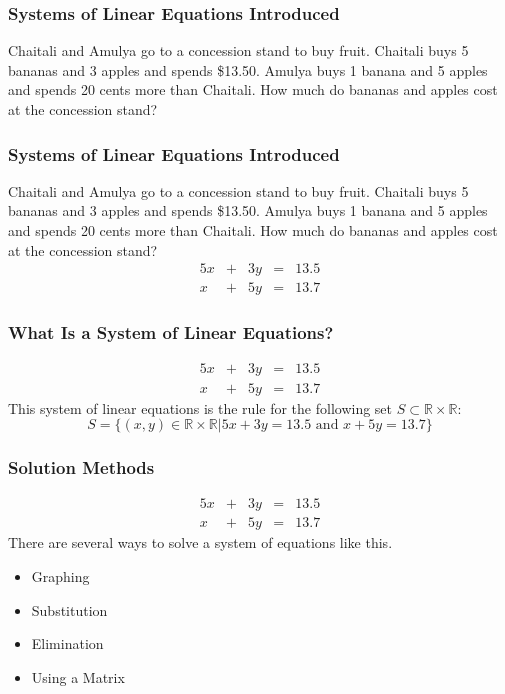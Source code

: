 \documentclass[xcolor=dvipsnames]{beamer}
\begin{document}
\begin{frame}
  \frametitle{Systems of Linear Equations Introduced}
  Chaitali and Amulya go to a concession stand to buy fruit. Chaitali
  buys 5 bananas and 3 apples and spends \$13.50. Amulya buys 1 banana
  and 5 apples and spends 20 cents more than Chaitali. How much do
  bananas and apples cost at the concession stand?
\end{frame}

\begin{frame}
  \frametitle{Systems of Linear Equations Introduced}
  Chaitali and Amulya go to a concession stand to buy fruit. Chaitali
  buys 5 bananas and 3 apples and spends \$13.50. Amulya buys 1 banana
  and 5 apples and spends 20 cents more than Chaitali. How much do
  bananas and apples cost at the concession stand?
  \begin{equation}
    \label{eq:mohloogh}
    \begin{array}{rcrcl}
      5x&+&3y&=&13.5 \\
      x&+&5y&=&13.7
    \end{array}
  \end{equation}
\end{frame}

\begin{frame}
  \frametitle{What Is a System of Linear Equations?}
  \begin{equation}
    \label{eq:xaigeeke}
    \begin{array}{rcrcl}
      5x&+&3y&=&13.5 \\
      x&+&5y&=&13.7
    \end{array}
  \end{equation}
  This system of linear equations is the rule for the following set $S\subset\mathbb{R}\times\mathbb{R}$:
  \begin{equation}
    \label{eq:ahshohwa}
S=\{(x,y)\in\mathbb{R}\times\mathbb{R}|5x+3y=13.5\mbox{ and }x+5y=13.7\}
  \end{equation}
\end{frame}

\begin{frame}
  \frametitle{Solution Methods}
  \begin{equation}
    \label{eq:yeghahpi}
    \begin{array}{rcrcl}
      5x&+&3y&=&13.5 \\
      x&+&5y&=&13.7
    \end{array}
  \end{equation}
There are several ways to solve a system of equations like this. 
\begin{itemize}
\item Graphing
\item Substitution
\item Elimination
\item Using a Matrix
\end{itemize}
\end{frame}
\end{document}
